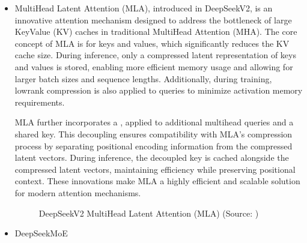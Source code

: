 \documentclass[letterpaper,11pt,english]{sphinxmanual}
\begin{document}
\sphinxAtStartPar
{}
\begin{itemize}
\item {} 
\sphinxAtStartPar
{}

\sphinxAtStartPar
Multi\sphinxhyphen{}Head Latent Attention (MLA), introduced in DeepSeek\sphinxhyphen{}V2, is an
innovative attention mechanism designed to address the bottleneck of
large Key\sphinxhyphen{}Value (KV) caches in traditional Multi\sphinxhyphen{}Head Attention (MHA).
The core concept of MLA is  for keys and
values, which significantly reduces the KV cache size. During
inference, only a compressed latent representation of keys and values
is stored, enabling more efficient memory usage and allowing for
larger batch sizes and sequence lengths. Additionally, during
training, low\sphinxhyphen{}rank compression is also applied to queries to minimize
activation memory requirements. 

\sphinxAtStartPar
MLA further incorporates a , applied to additional multi\sphinxhyphen{}head queries and a shared key.
This decoupling ensures compatibility with MLA’s compression process
by separating positional encoding information from the compressed
latent vectors. During inference, the decoupled key is cached
alongside the compressed latent vectors, maintaining efficiency while
preserving positional context. These innovations make MLA a highly
efficient and scalable solution for modern attention mechanisms.

\begin{figure}[htbp]
\centering
\capstart

\noindent{}
\caption{DeepSeek\sphinxhyphen{}V2 Multi\sphinxhyphen{}Head Latent Attention (MLA) (Source: )}\label{\detokenize{pretraining:id29}}\end{figure}

\item {} 
\sphinxAtStartPar
DeepSeekMoE


\end{itemize}
\end{document}
